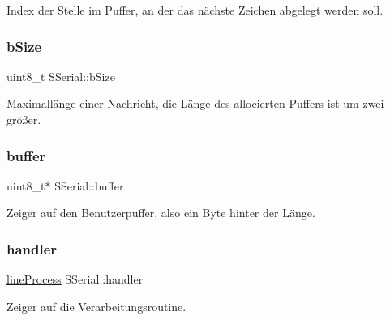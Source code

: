 Index der Stelle im Puffer, an der das nächste Zeichen abgelegt werden soll. 

\mbox{\label{class_s_serial_aaff6d77ae9a9b281c2f5ad22188fffab}} 
\subsubsection{\texorpdfstring{b\+Size}{bSize}}
{\footnotesize\ttfamily uint8\+\_\+t S\+Serial\+::b\+Size\hspace{0.3cm}{\ttfamily [protected]}}



Maximallänge einer Nachricht, die Länge des allocierten Puffers ist um zwei größer. 

\mbox{\label{class_s_serial_a56fe3cf5655bae95a5bc80230280dde3}} 
\subsubsection{\texorpdfstring{buffer}{buffer}}
{\footnotesize\ttfamily uint8\+\_\+t$\ast$ S\+Serial\+::buffer\hspace{0.3cm}{\ttfamily [protected]}}



Zeiger auf den Benutzerpuffer, also ein Byte hinter der Länge. 

\mbox{\label{class_s_serial_a544190e3b803cb35b4ec5e5fa9bb3ff0}} 
\subsubsection{\texorpdfstring{handler}{handler}}
{\footnotesize\ttfamily \hyperlink{_whandall_serial_8h_a3241d91f371dd5951b01532bce8e7be2}{line\+Process} S\+Serial\+::handler\hspace{0.3cm}{\ttfamily [protected]}}



Zeiger auf die Verarbeitungsroutine. 

\mbox{\label{class_s_serial_a3255a7976e6239590a0c092db3786e12}} 
